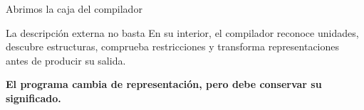 \documentclass[11pt,spanish]{beamer}
\newcommand{\term}[1]{\textbf{\textcolor{indiagreen!80!black}{#1}}}
\begin{document}
\begin{frame}{Abrimos la caja del compilador}
\vfill

\begin{center}
\end{center}

\bigskip

\begin{block}{La descripción externa no basta}
En su interior, el compilador reconoce unidades, descubre estructuras, comprueba restricciones y transforma representaciones antes de producir su salida.
\end{block}

\bigskip

\begin{center}
\term{El programa cambia de representación, pero debe conservar su significado.}
\end{center}

\vfill
\end{frame}
\end{document}

